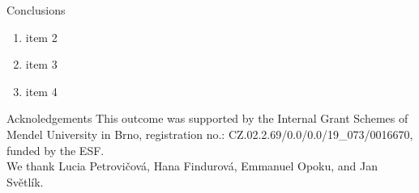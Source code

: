 \documentclass[final]{beamer}
\newlength{\sepwidth}
\newlength{\colwidth}
\newcommand{\separatorcolumn}{\begin{column}{\sepwidth}\end{column}}
\begin{document}
\begin{frame}[t]
\begin{columns}[t]
\begin{column}{\colwidth}
\end{column}
\end{columns}

\begin{columns}[c]
\begin{column}{0.96\paperwidth}
\begin{block}{Conclusions}
    \begin{enumerate}
        \item item 2
        \item item 3
        \item item 4
    \end{enumerate}

\end{block}

\begin{block}{Acknoledgements}
\small \centering
    This outcome was supported by the Internal Grant Schemes of Mendel University in Brno, registration no.: CZ.02.2.69/0.0/0.0/19\_073/0016670, funded by the ESF. \\
    We thank Lucia Petrovičová, Hana Findurová, Emmanuel Opoku, and Jan Světlík.
\end{block}

\end{column}
%
%
\end{columns}
\end{frame}
\end{document}
